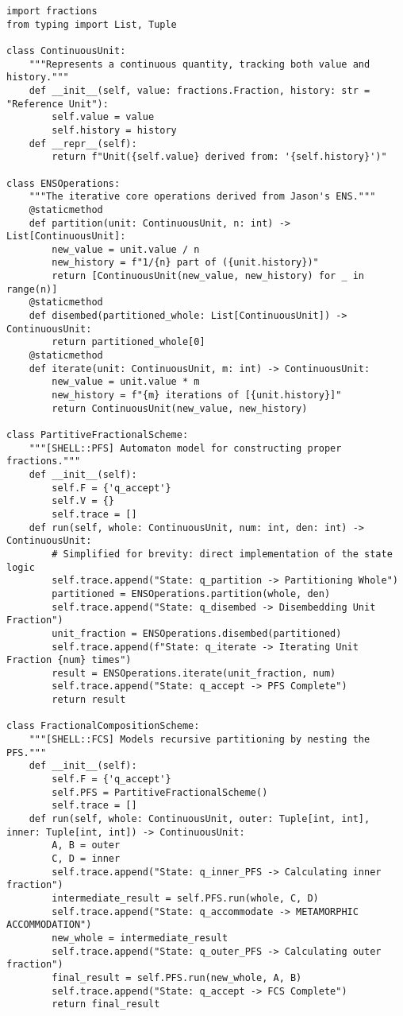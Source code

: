 \documentclass{article}
\begin{document}
\begin{verbatim}
import fractions
from typing import List, Tuple

class ContinuousUnit:
    """Represents a continuous quantity, tracking both value and history."""
    def __init__(self, value: fractions.Fraction, history: str = "Reference Unit"):
        self.value = value
        self.history = history
    def __repr__(self):
        return f"Unit({self.value} derived from: '{self.history}')"

class ENSOperations:
    """The iterative core operations derived from Jason's ENS."""
    @staticmethod
    def partition(unit: ContinuousUnit, n: int) -> List[ContinuousUnit]:
        new_value = unit.value / n
        new_history = f"1/{n} part of ({unit.history})"
        return [ContinuousUnit(new_value, new_history) for _ in range(n)]
    @staticmethod
    def disembed(partitioned_whole: List[ContinuousUnit]) -> ContinuousUnit:
        return partitioned_whole[0]
    @staticmethod
    def iterate(unit: ContinuousUnit, m: int) -> ContinuousUnit:
        new_value = unit.value * m
        new_history = f"{m} iterations of [{unit.history}]"
        return ContinuousUnit(new_value, new_history)

class PartitiveFractionalScheme:
    """[SHELL::PFS] Automaton model for constructing proper fractions."""
    def __init__(self):
        self.F = {'q_accept'}
        self.V = {}
        self.trace = []
    def run(self, whole: ContinuousUnit, num: int, den: int) -> ContinuousUnit:
        # Simplified for brevity: direct implementation of the state logic
        self.trace.append("State: q_partition -> Partitioning Whole")
        partitioned = ENSOperations.partition(whole, den)
        self.trace.append("State: q_disembed -> Disembedding Unit Fraction")
        unit_fraction = ENSOperations.disembed(partitioned)
        self.trace.append(f"State: q_iterate -> Iterating Unit Fraction {num} times")
        result = ENSOperations.iterate(unit_fraction, num)
        self.trace.append("State: q_accept -> PFS Complete")
        return result

class FractionalCompositionScheme:
    """[SHELL::FCS] Models recursive partitioning by nesting the PFS."""
    def __init__(self):
        self.F = {'q_accept'}
        self.PFS = PartitiveFractionalScheme() 
        self.trace = []
    def run(self, whole: ContinuousUnit, outer: Tuple[int, int], inner: Tuple[int, int]) -> ContinuousUnit:
        A, B = outer
        C, D = inner
        self.trace.append("State: q_inner_PFS -> Calculating inner fraction")
        intermediate_result = self.PFS.run(whole, C, D)
        self.trace.append("State: q_accommodate -> METAMORPHIC ACCOMMODATION")
        new_whole = intermediate_result
        self.trace.append("State: q_outer_PFS -> Calculating outer fraction")
        final_result = self.PFS.run(new_whole, A, B)
        self.trace.append("State: q_accept -> FCS Complete")
        return final_result
\end{verbatim}
\end{document}
